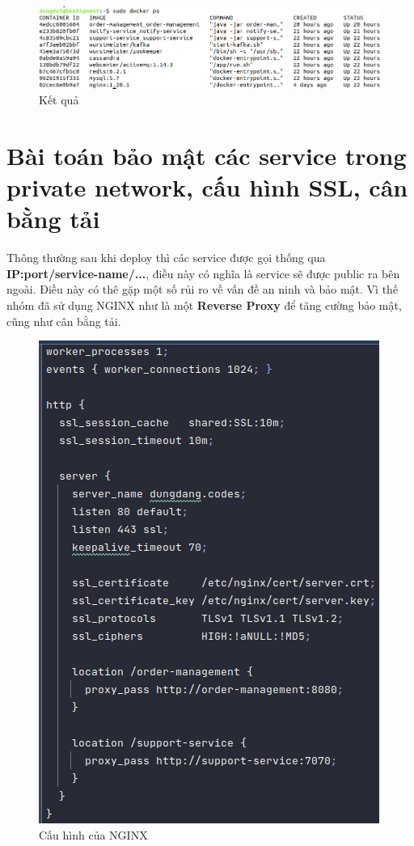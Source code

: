 		  \begin{figure}
		  	\centering
		  	\includegraphics[width=0.8\linewidth]{Images/DockerResult}
		  	\linebreak
		  	\caption{Kết quả}
		  \end{figure}
	  
	  \newpage
	  
	  \section{Bài toán bảo mật các service trong private network, cấu hình SSL, cân bằng tải}
	  
	  Thông thường sau khi deploy thì các service được gọi thống qua \textbf{IP:port/service-name/...}, điều này có nghĩa là service sẽ được public ra bên ngoài. Điều này có thê gặp một số rủi ro về vấn đề an ninh và bảo mật. Vì thế nhóm đã sử dụng NGINX như là một \textbf{Reverse Proxy} để tăng cường bảo mật, cũng như cân bằng tải.\\ 
	  
	  
	  \begin{figure}[H]
	  	\centering
	  	\includegraphics[width=0.7\linewidth]{Images/NGINXconfig}
	  	\linebreak
	  	\caption{Cấu hình của NGINX}
	  \end{figure}
  	

